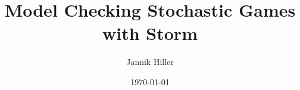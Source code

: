 \documentclass[aspectratio=169]{beamer}
\begin{document}
\title{Model Checking Stochastic Games with Storm}
\author{Jannik Hiller}
\date{\today}

\maketitle





\end{document}
